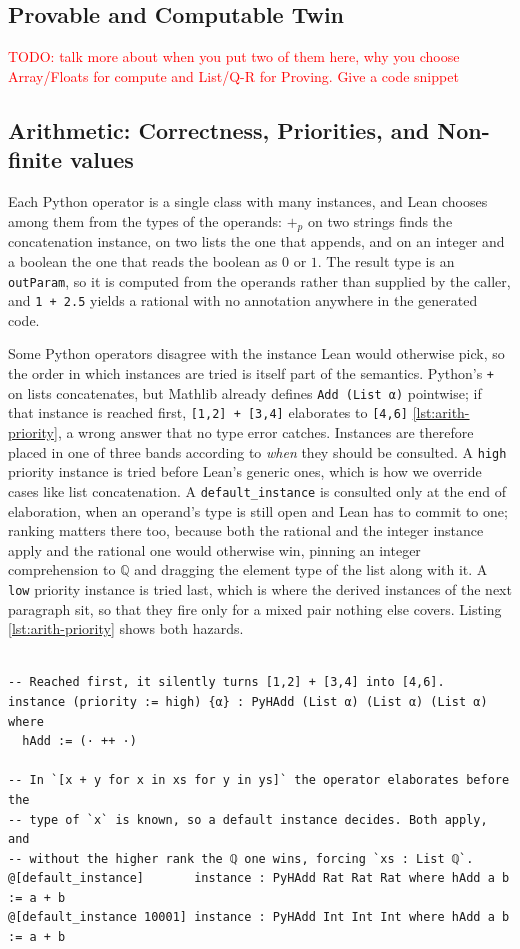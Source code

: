 \documentclass{article}
\newcommand{\code}{\lstinline}
\newcommand{\todo}[1]{\textcolor{red}{TODO: #1}}
\begin{document}
\subsection{Provable and Computable Twin}
\todo{talk more about when you put two of them here, why you choose Array/Floats for compute and List/Q-R for Proving. Give a code snippet}

\subsection{Arithmetic: Correctness, Priorities, and Non-finite values}\label{app:arith}

Each Python operator is a single class with many instances, and Lean chooses among them from the types of the operands: $+_p$ on two strings finds the concatenation instance, on two lists the one that appends, and on an integer and a boolean the one that reads the boolean as $0$ or $1$. The result type is an \code{outParam}, so it is computed from the operands rather than supplied by the caller, and \code{1 + 2.5} yields a rational with no annotation anywhere in the generated code.

Some Python operators disagree with the instance Lean would otherwise pick, so the order in which instances are tried is itself part of the semantics. Python's \code{+} on lists concatenates, but Mathlib already defines \code{Add (List α)} pointwise; if that instance is reached first, \code{[1,2] + [3,4]} elaborates to \code{[4,6]} \ref{lst:arith-priority}, a wrong answer that no type error catches. Instances are therefore placed in one of three bands according to \emph{when} they should be consulted. A \code{high} priority instance is tried before Lean's generic ones, which is how we override cases like list concatenation. A \code{default_instance} is consulted only at the end of elaboration, when an operand's type is still open and Lean has to commit to one; ranking matters there too, because both the rational and the integer instance apply and the rational one would otherwise win, pinning an integer comprehension to $\mathbb{Q}$ and dragging the element type of the list along with it. A \code{low} priority instance is tried last, which is where the derived instances of the next paragraph sit, so that they fire only for a mixed pair nothing else covers. Listing \ref{lst:arith-priority} shows both hazards.

\begin{lstlisting}[style=lean,caption={Two places where instance ordering decides the answer.},label={lst:arith-priority}]

-- Reached first, it silently turns [1,2] + [3,4] into [4,6].
instance (priority := high) {α} : PyHAdd (List α) (List α) (List α) where
  hAdd := (· ++ ·)

-- In `[x + y for x in xs for y in ys]` the operator elaborates before the
-- type of `x` is known, so a default instance decides. Both apply, and
-- without the higher rank the ℚ one wins, forcing `xs : List ℚ`.
@[default_instance]       instance : PyHAdd Rat Rat Rat where hAdd a b := a + b
@[default_instance 10001] instance : PyHAdd Int Int Int where hAdd a b := a + b
\end{lstlisting}
\end{document}
